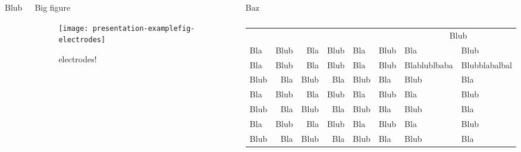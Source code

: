 \documentclass[english,xcolor=table,t
]{beamer}
\begin{document}
\begin{frame}
\begin{columns}
\begin{block}{Blub}
\lipsum[3-5]

\end{block}


\begin{block}{Big figure}

\begin{figure}
\texttt{[image: presentation-examplefig-electrodes]}
\caption{electrodes!}
\end{figure}

\end{block}

\begin{block}{Baz}

\lipsum[6-7]


\begin{table}
    \begin{tabular}{lrrrllll}
            \rowcolor{kuldark!20}
                &     &                     &         &      &          &
                \multicolumn{2}{c}{\cellcolor{kuldark!20}Blub} \\
        Bla & Blub & Bla & Blub & Bla & Blub &
        Bla & Blub \\
        Bla & Blub & Bla & Blub & Bla & Blub & Blablublbaba & Blubblabalbal \\
        Blub & Bla & Blub & Bla & Blub & Bla & Blub & Bla \\
        Bla & Blub & Bla & Blub & Bla & Blub & Bla & Blub \\
        Blub & Bla & Blub & Bla & Blub & Bla & Blub & Bla \\
        Bla & Blub & Bla & Blub & Bla & Blub & Bla & Blub \\
        Blub & Bla & Blub & Bla & Blub & Bla & Blub & Bla \\
    \end{tabular}
    \caption{\lipsum[9]}
    \label{tab:blub}
\end{table}

\vskip0.4cm

\end{block}

\end{columns}

\begin{columns}



\end{columns}
\end{frame}
\end{document}
